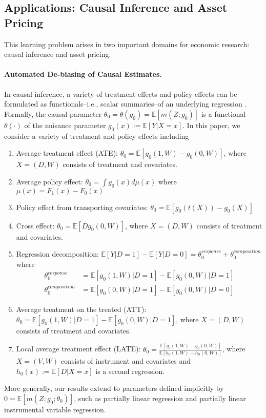 \subsection{Applications: Causal Inference and Asset Pricing}\label{sec:intro_examples}

This learning problem arises in two important domains for economic research: causal inference and asset pricing.

\paragraph{Automated De-biasing of Causal Estimates.} In causal inference, a variety of treatment effects and policy effects can be formulated as functionals--i.e., scalar summaries--of an underlying regression \cite{chernozhukov2016locally}. Formally, the causal parameter $\theta_0=\theta(g_0)=\mathbb{E}[m(Z;g_0)]$ is a functional $\theta(\cdot)$ of the nuisance parameter $g_0(x):=\mathbb{E}[Y|X=x]$. In this paper, we consider a variety of treatment and policy effects including
\begin{enumerate}
    \item Average treatment effect (ATE): $\theta_0=\mathbb{E}[g_0(1,W)-g_0(0,W)]$, where $X=(D,W)$ consists of treatment and covariates.
    \item Average policy effect: $\theta_0=\int g_0(x)d\mu(x)$ where $\mu(x)=F_1(x)-F_0(x)$
    \item Policy effect from transporting covariates: $\theta_0=\mathbb{E}[g_0(t(X))-g_0(X)]$
    \item Cross effect: $\theta_0=\mathbb{E}[Dg_0(0,W)]$, where $X=(D,W)$ consists of treatment and covariates.
    \item Regression decomposition: $\mathbb{E}[Y|D=1]-\mathbb{E}[Y|D=0]=\theta_0^{response}+\theta_0^{composition}$
    where
    \begin{align}
        \theta_0^{response}&=\mathbb{E}[g_0(1,W)|D=1]-\mathbb{E}[g_0(0,W)|D=1] \\
        \theta_0^{composition}&=\mathbb{E}[g_0(0,W)|D=1]-\mathbb{E}[g_0(0,W)|D=0]
    \end{align}
    \item Average treatment on the treated (ATT): $\theta_0=\mathbb{E}[g_0(1,W)|D=1]-\mathbb{E}[g_0(0,W)|D=1]$, where $X=(D,W)$ consists of treatment and covariates.
    \item Local average treatment effect (LATE): $\theta_0=\frac{\mathbb{E}[g_0(1,W)-g_0(0,W)]}{\mathbb{E}[h_0(1,W)-h_0(0,W)]}$, where $X=(V,W)$ consists of instrument and covariates and $h_0(x):=\mathbb{E}[D|X=x]$ is a second regression.
\end{enumerate}
More generally, our results extend to parameters defined implicitly by $0=\mathbb{E}[m(Z;g_0;\theta_0)]$, such as partially linear regression and partially linear instrumental variable regression.

